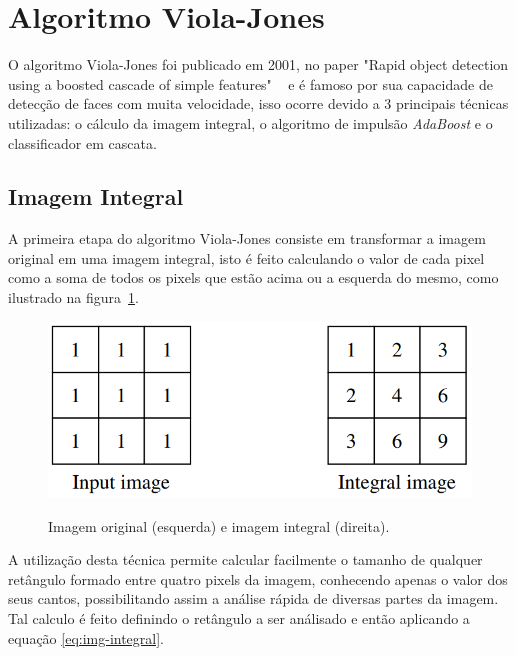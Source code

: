 \section{Algoritmo Viola-Jones}

O algoritmo Viola-Jones foi publicado em 2001, no paper "Rapid object detection using a boosted cascade of simple features" ~\cite{paper-viola-jones} e é famoso por sua capacidade de detecção de faces com muita velocidade, isso ocorre devido a 3 principais técnicas utilizadas: o cálculo da imagem integral, o algoritmo de impulsão \textit{AdaBoost} e o classificador em cascata.

\subsection{Imagem Integral}

A primeira etapa do algoritmo Viola-Jones consiste em transformar a imagem original em uma imagem integral, isto é feito calculando o valor de cada pixel como a soma de todos os pixels que estão acima ou a esquerda do mesmo, como ilustrado na figura~\ref{fig:integral}.

\begin{figure}[htpb]
    \centering
    \caption{Imagem original (esquerda) e imagem integral (direita).}
    \includegraphics[scale=.4]{figs/imagem-integral.png}
    \label{fig:integral}
 \end{figure}

A utilização desta técnica permite calcular facilmente o tamanho de qualquer retângulo formado entre quatro pixels da imagem, conhecendo apenas o valor dos seus cantos, possibilitando assim a análise rápida de diversas partes da imagem. Tal calculo é feito definindo o retângulo a ser análisado e então aplicando a equação \ref{eq:img-integral}.

